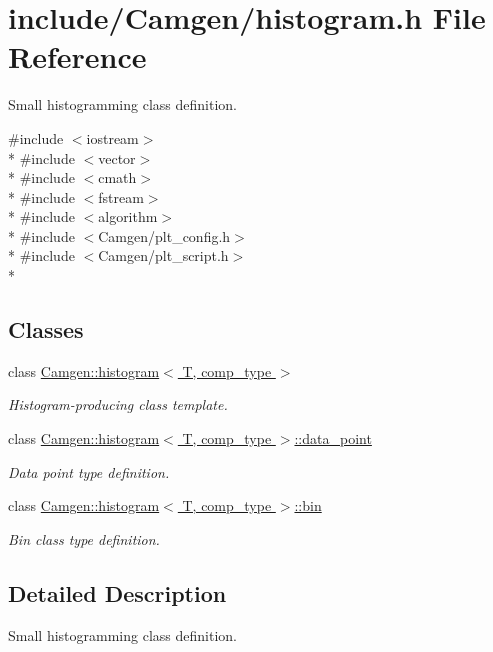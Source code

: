 \hypertarget{a00645}{\section{include/\-Camgen/histogram.h File Reference}
\label{a00645}
}


Small histogramming class definition.  


{\ttfamily \#include $<$iostream$>$}\\*
{\ttfamily \#include $<$vector$>$}\\*
{\ttfamily \#include $<$cmath$>$}\\*
{\ttfamily \#include $<$fstream$>$}\\*
{\ttfamily \#include $<$algorithm$>$}\\*
{\ttfamily \#include $<$Camgen/plt\-\_\-config.\-h$>$}\\*
{\ttfamily \#include $<$Camgen/plt\-\_\-script.\-h$>$}\\*
\subsection*{Classes}
\begin{DoxyCompactItemize}
\item 
class \hyperlink{a00280}{Camgen\-::histogram$<$ T, comp\-\_\-type $>$}
\begin{DoxyCompactList}\small\item\em Histogram-\/producing class template. \end{DoxyCompactList}\item 
class \hyperlink{a00116}{Camgen\-::histogram$<$ T, comp\-\_\-type $>$\-::data\-\_\-point}
\begin{DoxyCompactList}\small\item\em Data point type definition. \end{DoxyCompactList}\item 
class \hyperlink{a00028}{Camgen\-::histogram$<$ T, comp\-\_\-type $>$\-::bin}
\begin{DoxyCompactList}\small\item\em Bin class type definition. \end{DoxyCompactList}\end{DoxyCompactItemize}


\subsection{Detailed Description}
Small histogramming class definition. 